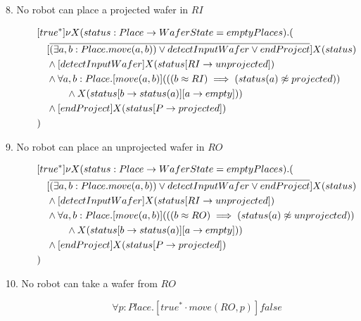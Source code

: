 \begin{description}
 \item[8. No robot can place a projected wafer in $RI$]

\begin{align*}
&[true^*] \nu X(status:Place \to WaferState=emptyPlaces).( \\
&\tab  [\overline{(\exists a,b:Place.move(a,b)) \vee detectInputWafer \vee endProject}]X(status) \\
&\tab  \wedge [detectInputWafer]X(status[RI \to unprojected]) \\
&\tab  \wedge \forall a,b:Place.[move(a, b)](((b \approx RI) \implies (status(a) \not \approx projected)) \\
&\tab\tab\tab \wedge X(status[b \to status(a)][a \to empty])) \\
&\tab  \wedge [endProject]X(status[P \to projected]) \\
&)
\end{align*}

 \item[9. No robot can place an unprojected wafer in $RO$]

\begin{align*}
&[true^*] \nu X(status:Place \to WaferState=emptyPlaces).( \\
&\tab  [\overline{(\exists a,b:Place.move(a,b)) \vee detectInputWafer \vee endProject}]X(status) \\
&\tab  \wedge [detectInputWafer]X(status[RI \to unprojected]) \\
&\tab  \wedge \forall a,b:Place.[move(a, b)](((b \approx RO) \implies (status(a) \not \approx unprojected)) \\
&\tab\tab\tab \wedge X(status[b \to status(a)][a \to empty])) \\
&\tab  \wedge [endProject]X(status[P \to projected]) \\
&)
\end{align*}

 \item[10. No robot can take a wafer from $RO$]

\[
	\forall p:Place . [true^* \cdot move(RO, p)]false
\]

\end{description}
